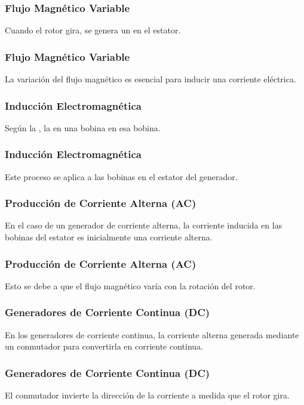 \documentclass[14pt]{beamer}
\begin{document}
\begin{frame}
\frametitle{Flujo Magnético Variable}
Cuando el rotor gira, se genera un  en el estator.
\end{frame}
\begin{frame}
\frametitle{Flujo Magnético Variable}
La variación del flujo magnético es esencial para inducir una corriente eléctrica.
\end{frame}
\begin{frame}
\frametitle{Inducción Electromagnética}
Según la , \pause la  en una bobina \pause {} en esa bobina.
\end{frame}
\begin{frame}
\frametitle{Inducción Electromagnética}
Este proceso se aplica a las bobinas en el estator del generador.
\end{frame}
\begin{frame}
\frametitle{Producción de Corriente Alterna (AC)}
En el caso de un generador de corriente alterna, la corriente inducida en las bobinas del estator es inicialmente una corriente alterna.
\end{frame}
\begin{frame}
\frametitle{Producción de Corriente Alterna (AC)}
Esto se debe a que el flujo magnético varía con la rotación del rotor.
\end{frame}
\begin{frame}
\frametitle{Generadores de Corriente Continua (DC)}
En los generadores de corriente continua, la corriente alterna generada  mediante un conmutador para convertirla en corriente continua.
\end{frame}
\begin{frame}
\frametitle{Generadores de Corriente Continua (DC)}
El conmutador invierte la dirección de la corriente a medida que el rotor gira.
\end{frame}
\end{document}
